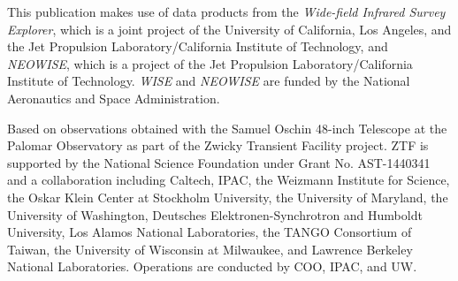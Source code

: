 \documentclass[fleqn,usenatbib]{mnras}
\begin{document}
This publication makes use of data products from the {\it Wide-field
Infrared Survey Explorer}, which is a joint project of the University
of California, Los Angeles, and the Jet Propulsion
Laboratory/California Institute of Technology, and {\it NEOWISE}, which is a
project of the Jet Propulsion Laboratory/California Institute of
Technology. {\it WISE} and {\it NEOWISE} are funded by the National Aeronautics
and Space Administration.

Based on observations obtained with the Samuel Oschin 48-inch Telescope at the Palomar Observatory as part of the Zwicky Transient Facility project. ZTF is supported by the National Science Foundation under Grant No. AST-1440341 and a collaboration including Caltech, IPAC, the Weizmann Institute for Science, the Oskar Klein Center at Stockholm University, the University of Maryland, the University of Washington, Deutsches Elektronen-Synchrotron and Humboldt University, Los Alamos National Laboratories, the TANGO Consortium of Taiwan, the University of Wisconsin at Milwaukee, and Lawrence Berkeley National Laboratories. Operations are conducted by COO, IPAC, and UW.
 





\bsp	%
\label{lastpage}
\end{document}
